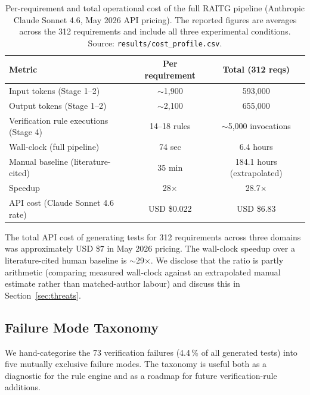 \documentclass[review,12pt]{elsarticle}
\begin{document}
\begin{table}[!ht]
\centering
\caption{Per-requirement and total operational cost of the full
RAITG pipeline (Anthropic Claude Sonnet 4.6, May 2026 API pricing).
The reported figures are averages across the 312 requirements and
include all three experimental conditions. Source:
\texttt{results/cost\_profile.csv}.}
\label{tab:cost_e}
\small
\begin{tabular}{lcc}
\toprule
Metric                                  & Per requirement & Total (312 reqs) \\
\midrule
Input tokens (Stage 1--2)               & $\sim$1{,}900   & 593{,}000 \\
Output tokens (Stage 1--2)              & $\sim$2{,}100   & 655{,}000 \\
Verification rule executions (Stage 4)  & 14--18 rules    & $\sim$5{,}000 invocations \\
Wall-clock (full pipeline)              & 74 sec          & 6.4 hours \\
Manual baseline (literature-cited)      & 35 min          & 184.1 hours (extrapolated) \\
Speedup                                 & 28$\times$      & 28.7$\times$ \\
API cost (Claude Sonnet 4.6 rate)       & USD \$0.022     & USD \$6.83 \\
\bottomrule
\end{tabular}
\end{table}

The total API cost of generating tests for 312 requirements across
three domains was approximately USD \$7 in May 2026 pricing. The
wall-clock speedup over a literature-cited human baseline is
$\sim$29$\times$. We disclose that the ratio is partly arithmetic
(comparing measured wall-clock against an extrapolated manual
estimate rather than matched-author labour) and discuss this in
Section~\ref{sec:threats}.

\subsection{Failure Mode Taxonomy}
\label{sec:failure_modes}

We hand-categorise the 73 verification failures (4.4\,\% of all
generated tests) into five mutually exclusive failure modes. The
taxonomy is useful both as a diagnostic for the rule engine and as a
roadmap for future verification-rule additions.
\end{document}
